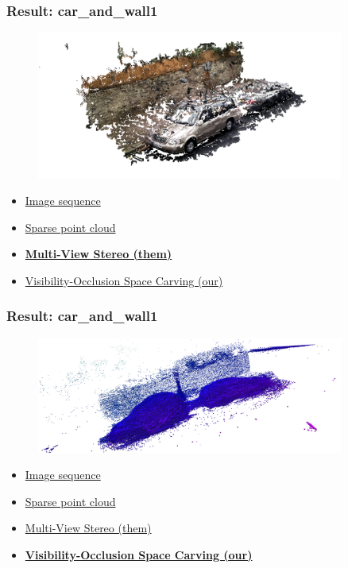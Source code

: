 \documentclass{beamer}
\begin{document}
\begin{frame}
  \frametitle{Result: car\_and\_wall1}
  \begin{figure}[htb!]
   \centering
   \includegraphics[width=0.9\textwidth]{img/car_and_wall1_dense}  %
  \end{figure}
  \begin{itemize}
    \item \href{run:./vid/01-result1-seq.mp4}{Image sequence} \\
    \item \href{run:./vid/02-result1-sparse.mp4}{Sparse point cloud} \\
    \item \href{run:./vid/03-result1-mvs.mp4}{\textbf{Multi-View Stereo (them)}} \\
    \item \href{run:./vid/04-result1-visocc.mp4}{Visibility-Occlusion Space Carving (our)} \\
  \end{itemize}
\end{frame}
\begin{frame}
  \frametitle{Result: car\_and\_wall1}
  \begin{figure}[htb!]
   \centering
   \includegraphics[width=0.9\textwidth]{img/car_and_wall1_carve2}  %
  \end{figure}
  \begin{itemize}
    \item \href{run:./vid/01-result1-seq.mp4}{Image sequence} \\
    \item \href{run:./vid/02-result1-sparse.mp4}{Sparse point cloud} \\
    \item \href{run:./vid/03-result1-mvs.mp4}{Multi-View Stereo (them)} \\
    \item \href{run:./vid/04-result1-visocc.mp4}{\textbf{Visibility-Occlusion Space Carving (our)}} \\
  \end{itemize}
\end{frame}
\end{document}
